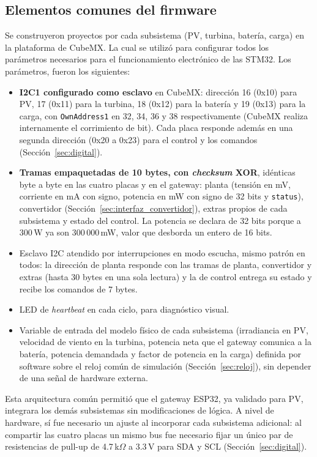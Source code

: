 \documentclass[conference]{IEEEtran}
\begin{document}
\subsection{Elementos comunes del firmware}
\label{sec:firmware_comun}

Se construyeron proyectos por cada subsistema (PV, turbina, batería, carga) en la plataforma de CubeMX. La cual se utilizó para configurar todos los parámetros necesarios para el funcionamiento electrónico de las STM32. Los parámetros, fueron los siguientes:

\begin{itemize}
\item \textbf{I2C1 configurado como esclavo} en CubeMX: dirección 16 (0x10) para PV, 17 (0x11) para la turbina, 18 (0x12) para la batería y 19 (0x13) para la carga, con \texttt{OwnAddress1} en 32, 34, 36 y 38 respectivamente (CubeMX realiza internamente el corrimiento de bit). Cada placa responde además en una segunda dirección (0x20 a 0x23) para el control y los comandos (Sección~\ref{sec:digital}).
\item \textbf{Tramas empaquetadas de 10 bytes, con \emph{checksum} XOR}, idénticas byte a byte en las cuatro placas y en el gateway: planta (tensión en mV, corriente en mA con signo, potencia en mW con signo de 32 bits y \texttt{status}), convertidor (Sección~\ref{sec:interfaz_convertidor}), extras propios de cada subsistema y estado del control. La potencia se declara de 32 bits porque a 300\,W ya son 300\,000\,mW, valor que desborda un entero de 16 bits.
\item Esclavo I2C atendido por interrupciones en modo escucha, mismo patrón en todos: la dirección de planta responde con las tramas de planta, convertidor y extras (hasta 30 bytes en una sola lectura) y la de control entrega su estado y recibe los comandos de 7 bytes.
\item LED de \emph{heartbeat} en cada ciclo, para diagnóstico visual.
\item Variable de entrada del modelo físico de cada subsistema (irradiancia en PV, velocidad de viento en la turbina, potencia neta que el gateway comunica a la batería, potencia demandada y factor de potencia en la carga) definida por software sobre el reloj común de simulación (Sección~\ref{sec:reloj}), sin depender de una señal de hardware externa.
\end{itemize}

Esta arquitectura común permitió que el gateway ESP32, ya validado para PV, integrara los demás subsistemas sin modificaciones de lógica. A nivel de hardware, sí fue necesario un ajuste al incorporar cada subsistema adicional: al compartir las cuatro placas un mismo bus fue necesario fijar un único par de resistencias de pull-up de 4.7\,k$\Omega$ a 3.3\,V para SDA y SCL (Sección~\ref{sec:digital}).
\end{document}
